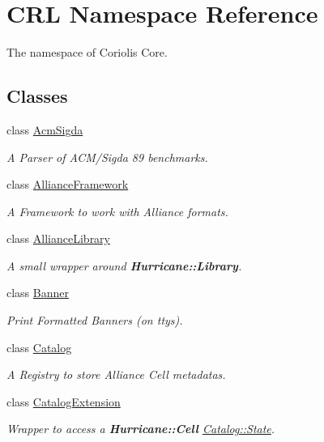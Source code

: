 \hypertarget{namespaceCRL}{}\section{C\+RL Namespace Reference}
\label{namespaceCRL}


The namespace of Coriolis Core.  


\subsection*{Classes}
\begin{DoxyCompactItemize}
\item 
class \mbox{\hyperlink{classCRL_1_1AcmSigda}{Acm\+Sigda}}
\begin{DoxyCompactList}\small\item\em A Parser of A\+C\+M/\+Sigda 89\textquotesingle{} benchmarks. \end{DoxyCompactList}\item 
class \mbox{\hyperlink{classCRL_1_1AllianceFramework}{Alliance\+Framework}}
\begin{DoxyCompactList}\small\item\em A Framework to work with Alliance formats. \end{DoxyCompactList}\item 
class \mbox{\hyperlink{classCRL_1_1AllianceLibrary}{Alliance\+Library}}
\begin{DoxyCompactList}\small\item\em A small wrapper around \textbf{ Hurricane\+::\+Library}. \end{DoxyCompactList}\item 
class \mbox{\hyperlink{classCRL_1_1Banner}{Banner}}
\begin{DoxyCompactList}\small\item\em Print Formatted Banners (on ttys). \end{DoxyCompactList}\item 
class \mbox{\hyperlink{classCRL_1_1Catalog}{Catalog}}
\begin{DoxyCompactList}\small\item\em A Registry to store Alliance Cell metadatas. \end{DoxyCompactList}\item 
class \mbox{\hyperlink{classCRL_1_1CatalogExtension}{Catalog\+Extension}}
\begin{DoxyCompactList}\small\item\em Wrapper to access a \textbf{ Hurricane\+::\+Cell} \mbox{\hyperlink{classCRL_1_1Catalog_1_1State}{Catalog\+::\+State}}. \end{DoxyCompactList}\item 

\end{DoxyCompactItemize}
